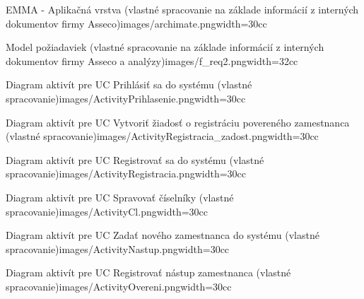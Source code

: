 
{EMMA - Aplikačná vrstva (vlastné spracovanie na základe informácií z interných dokumentov firmy Asseco)}{images/archimate.png}{width=30cc}


{Model požiadaviek (vlastné spracovanie na základe informácií z interných dokumentov firmy Asseco a analýzy)}{images/f_req2.png}{width=32cc}


{Diagram aktivít pre UC Prihlásiť sa do systému (vlastné spracovanie)}{images/ActivityPrihlasenie.png}{width=30cc}

{Diagram aktivít pre UC Vytvoriť žiadosť o registráciu povereného zamestnanca (vlastné spracovanie)}{images/ActivityRegistracia_zadost.png}{width=30cc}

{Diagram aktivít pre UC Registrovať sa do systému (vlastné spracovanie)}{images/ActivityRegistracia.png}{width=30cc}

{Diagram aktivít pre UC Spravovať číselníky (vlastné spracovanie)}{images/ActivityCl.png}{width=30cc}

{Diagram aktivít pre UC Zadať nového zamestnanca do systému (vlastné spracovanie)}{images/ActivityNastup.png}{width=30cc}

{Diagram aktivít pre UC Registrovať nástup zamestnanca (vlastné spracovanie)}{images/ActivityOvereni.png}{width=30cc}



